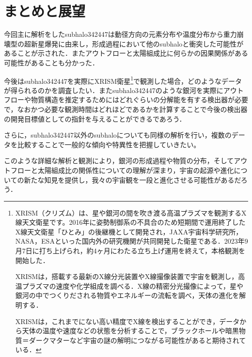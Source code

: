 \documentclass[main.tex]{subfiles}
\begin{document}
	\chapter{まとめと展望}
	今回主に解析をしたsubhalo342447は動径方向の元素分布や温度分布から重力崩壊型の超新星爆発に由来し，形成過程において他のsubhaloと衝突した可能性があることが示された．またアウトフローと太陽組成比に何らかの因果関係がある可能性があることも分かった．
	
	今後はsubhalo342447を実際にXRISM衛星\footnote{
	XRISM（クリズム）は、星や銀河の間を吹き渡る高温プラズマを観測するX線天文衛星です。2016年に姿勢制御系の不具合のため短期間で運用終了したX線天文衛星「ひとみ」の後継機として開発され，JAXA宇宙科学研究所，NASA，ESAといった国内外の研究機関が共同開発した衛星である．2023年9月7日に打ち上げられ，約4ヶ月にわたる立ち上げ運用を終えて，本格観測を開始した．
	
	XRISMは，搭載する最新のX線分光装置やX線撮像装置で宇宙を観測し，高温プラズマの速度や化学組成を調べる．X線の精密分光撮像によって，星や銀河の中でつくりだされる物質やエネルギーの流転を調べ，天体の進化を解明する．
	
	XRISMは，これまでにない高い精度でX線を検出することができ，データから天体の温度や速度などの状態を分析することで，ブラックホールや暗黒物質＝ダークマターなど宇宙の謎の解明につながる可能性があると期待されている．}で観測した場合，どのようなデータが得られるのかを調査したい．またsubhalo342447のような銀河を実際にアウトフローや物質構造を推定するためにはどれぐらいの分解能を有する検出器が必要で，なおかつ必要な観測時間はどれほどであるかを計算することで今後の検出器の開発目標値としての指針を与えることができるであろう．

	さらに，subhalo342447以外のsubhaloについても同様の解析を行い，複数のデータを比較することで一般的な傾向や特異性を把握していきたい。

	このような詳細な解析と観測により，銀河の形成過程や物質の分布，そしてアウトフローと太陽組成比の関係性についての理解が深まり，宇宙の起源や進化についての新たな知見を提供し，我々の宇宙観を一段と進化させる可能性があるだろう．
	
\end{document}

